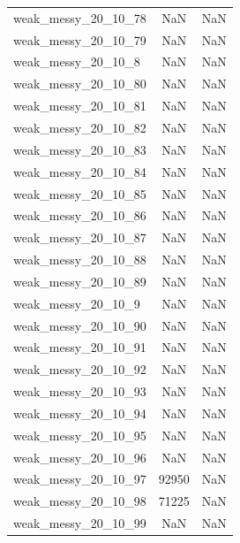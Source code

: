 \begin{longtable}{lcc}
weak\_messy\_20\_10\_78    &      NaN &    NaN \\
weak\_messy\_20\_10\_79    &      NaN &    NaN \\
weak\_messy\_20\_10\_8     &      NaN &    NaN \\
weak\_messy\_20\_10\_80    &      NaN &    NaN \\
weak\_messy\_20\_10\_81    &      NaN &    NaN \\
weak\_messy\_20\_10\_82    &      NaN &    NaN \\
weak\_messy\_20\_10\_83    &      NaN &    NaN \\
weak\_messy\_20\_10\_84    &      NaN &    NaN \\
weak\_messy\_20\_10\_85    &      NaN &    NaN \\
weak\_messy\_20\_10\_86    &      NaN &    NaN \\
weak\_messy\_20\_10\_87    &      NaN &    NaN \\
weak\_messy\_20\_10\_88    &      NaN &    NaN \\
weak\_messy\_20\_10\_89    &      NaN &    NaN \\
weak\_messy\_20\_10\_9     &      NaN &    NaN \\
weak\_messy\_20\_10\_90    &      NaN &    NaN \\
weak\_messy\_20\_10\_91    &      NaN &    NaN \\
weak\_messy\_20\_10\_92    &      NaN &    NaN \\
weak\_messy\_20\_10\_93    &      NaN &    NaN \\
weak\_messy\_20\_10\_94    &      NaN &    NaN \\
weak\_messy\_20\_10\_95    &      NaN &    NaN \\
weak\_messy\_20\_10\_96    &      NaN &    NaN \\
weak\_messy\_20\_10\_97    &    92950 &    NaN \\
weak\_messy\_20\_10\_98    &    71225 &    NaN \\
weak\_messy\_20\_10\_99    &      NaN &    NaN \\
\end{longtable}
